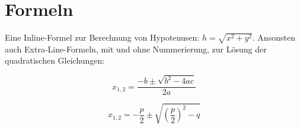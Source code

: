 \section{Formeln}

Eine Inline-Formel zur Berechnung von Hypotenusen: \( h = \sqrt{ x^2 + y^2 } \). Ansonsten auch Extra-Line-Formeln, mit und ohne Nummerierung, zur Lösung der quadratischen Gleichungen:

\begin{equation*}
x_{1,2} = \frac{-b \pm \sqrt{b^2-4ac}}{2a}
\end{equation*}

\begin{equation}
x_{1,2} = -\frac{p}{2} \pm \sqrt{\left(\frac{p}{2}\right)^2-q}
\end{equation}
